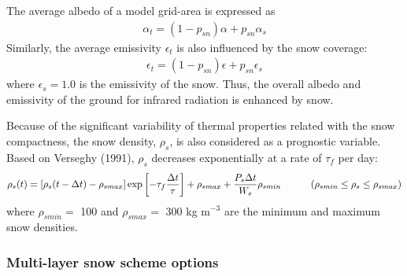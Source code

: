 The average albedo of a model grid-area is expressed as
\begin{eqnarray}
\alpha_t = (1-p_{sn}) \alpha + p_{sn} \alpha_s
\end{eqnarray}
Similarly, the average emissivity $\epsilon_t$ is also
influenced by the snow coverage:
\begin{eqnarray}
\epsilon_t = (1-p_{sn}) \epsilon + p_{sn} \epsilon_s
\end{eqnarray}
where $\epsilon_s = 1.0$ is the emissivity of the snow.
Thus, the overall albedo and emissivity of the ground for infrared radiation
is enhanced by snow.

Because of the significant variability of thermal properties related
with the snow compactness,
the snow density, $\rho_s$, is also considered
as a prognostic variable.
Based on Verseghy (1991)\nocite{Verseghy1991}, $\rho_s$ decreases exponentially at a rate
of $\tau_f$ per day:
%
\begin{equation}
\rho_s(t)=\left[ \rho_s(t-\Delta t) - \rho_{smax} \right]
\exp \left[ -\tau_f {\Delta t \over \tau } \right] + \rho_{smax}
+ {P_s \Delta t \over W_s} \rho_{smin}  
\hskip.4in
\left(\rho_{smin} \leq \rho_s \leq  \rho_{smax}\right)
\end{equation}
%
where
$\rho_{smin}=$ 100 and $\rho_{smax}=$ 300 kg m$^{-3}$
are the minimum and maximum snow densities.


\subsubsection{Multi-layer snow scheme options}
\label{sec:isba_multi_layer_snow}

